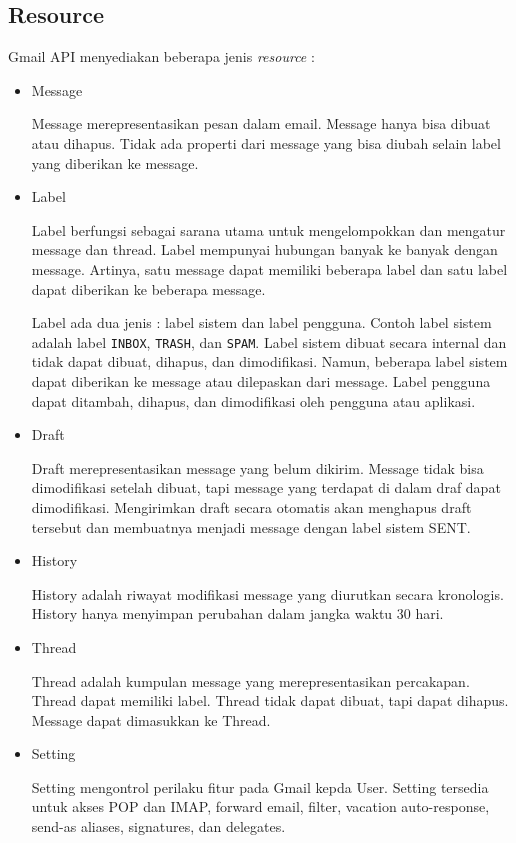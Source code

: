 \subsection{Resource}
Gmail API menyediakan beberapa jenis \textit{resource} :
\begin{itemize}
\item Message

Message merepresentasikan pesan dalam email. Message hanya bisa dibuat atau dihapus. Tidak ada properti dari message yang bisa diubah selain label yang diberikan ke message.

\item Label

Label berfungsi sebagai sarana utama untuk mengelompokkan dan mengatur message dan thread. Label mempunyai hubungan banyak ke banyak dengan message. Artinya, satu message dapat memiliki beberapa label dan satu label dapat diberikan ke beberapa message.

Label ada dua jenis : label sistem dan label pengguna. Contoh label sistem adalah label \texttt{INBOX}, \texttt{TRASH}, dan \texttt{SPAM}. Label sistem dibuat secara internal dan tidak dapat dibuat, dihapus, dan dimodifikasi. Namun, beberapa label sistem dapat diberikan ke message atau dilepaskan dari message. Label pengguna dapat ditambah, dihapus, dan dimodifikasi oleh pengguna atau aplikasi.

\item Draft

Draft merepresentasikan message yang belum dikirim. Message tidak bisa dimodifikasi setelah dibuat, tapi message yang terdapat di dalam draf dapat dimodifikasi. Mengirimkan draft secara otomatis akan menghapus draft tersebut dan membuatnya menjadi message dengan label sistem SENT.

\item History

History adalah riwayat modifikasi message yang diurutkan secara kronologis. History hanya menyimpan perubahan dalam jangka waktu 30 hari.

\item Thread

Thread adalah kumpulan message yang merepresentasikan percakapan. Thread dapat memiliki label. Thread tidak dapat dibuat, tapi dapat dihapus. Message dapat dimasukkan ke Thread.

\item Setting

Setting mengontrol perilaku fitur pada Gmail kepda User. Setting tersedia untuk akses POP dan IMAP, forward email, filter, vacation auto-response, send-as aliases, signatures, dan delegates.

\end{itemize}  

